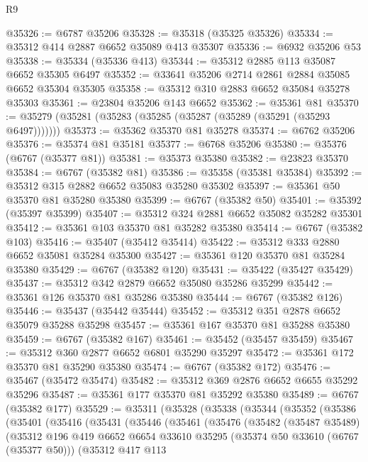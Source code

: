\begin{lexlean}{R9}
\begin{coremodule}
@35326 := @6787 @35206
@35328 := @35318 (@35325 @35326)
@35334 := @35312 @414 @2887 @6652 @35089 @413 @35307
@35336 := @6932 @35206 @53
@35338 := @35334 (@35336 @413)
@35344 := @35312 @2885 @113 @35087 @6652 @35305 @6497
@35352 := @33641 @35206 @2714 @2861 @2884 @35085 @6652 @35304 @35305
@35358 := @35312 @310 @2883 @6652 @35084 @35278 @35303
@35361 := @23804 @35206 @143 @6652
@35362 := @35361 @81
@35370 := @35279 (@35281 (@35283 (@35285 (@35287 (@35289 (@35291 (@35293 @6497)))))))
@35373 := @35362 @35370 @81 @35278
@35374 := @6762 @35206
@35376 := @35374 @81 @35181
@35377 := @6768 @35206
@35380 := @35376 (@6767 (@35377 @81))
@35381 := @35373 @35380
@35382 := @23823 @35370
@35384 := @6767 (@35382 @81)
@35386 := @35358 (@35381 @35384)
@35392 := @35312 @315 @2882 @6652 @35083 @35280 @35302
@35397 := @35361 @50 @35370 @81 @35280 @35380
@35399 := @6767 (@35382 @50)
@35401 := @35392 (@35397 @35399)
@35407 := @35312 @324 @2881 @6652 @35082 @35282 @35301
@35412 := @35361 @103 @35370 @81 @35282 @35380
@35414 := @6767 (@35382 @103)
@35416 := @35407 (@35412 @35414)
@35422 := @35312 @333 @2880 @6652 @35081 @35284 @35300
@35427 := @35361 @120 @35370 @81 @35284 @35380
@35429 := @6767 (@35382 @120)
@35431 := @35422 (@35427 @35429)
@35437 := @35312 @342 @2879 @6652 @35080 @35286 @35299
@35442 := @35361 @126 @35370 @81 @35286 @35380
@35444 := @6767 (@35382 @126)
@35446 := @35437 (@35442 @35444)
@35452 := @35312 @351 @2878 @6652 @35079 @35288 @35298
@35457 := @35361 @167 @35370 @81 @35288 @35380
@35459 := @6767 (@35382 @167)
@35461 := @35452 (@35457 @35459)
@35467 := @35312 @360 @2877 @6652 @6801 @35290 @35297
@35472 := @35361 @172 @35370 @81 @35290 @35380
@35474 := @6767 (@35382 @172)
@35476 := @35467 (@35472 @35474)
@35482 := @35312 @369 @2876 @6652 @6655 @35292 @35296
@35487 := @35361 @177 @35370 @81 @35292 @35380
@35489 := @6767 (@35382 @177)
@35529 := @35311
    (@35328
      (@35338
        (@35344
          (@35352
            (@35386
              (@35401
                (@35416
                  (@35431
                    (@35446
                      (@35461
                        (@35476
                          (@35482
                            (@35487 @35489)
                            (@35312
                              @196
                              @419
                              @6652
                              @6654
                              @33610
                              @35295
                              (@35374 @50 @33610 (@6767 (@35377 @50)))
                              (@35312
                                @417
                                @113

\end{coremodule}
\end{lexlean}
